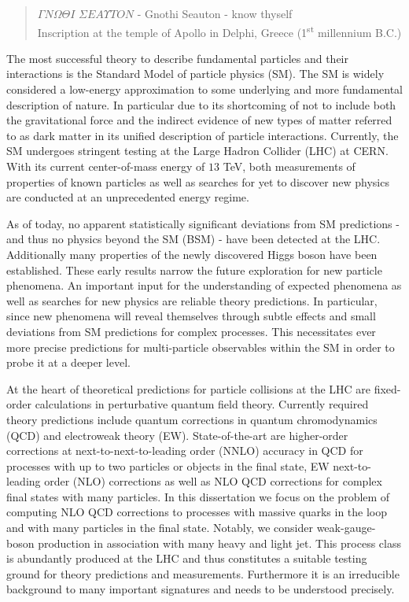 \begin{quote}
$\Gamma N \Omega \Theta I$ $\Sigma E A \Upsilon T
O N$ - Gnothi Seauton - know thyself\\
Inscription at the temple of Apollo in Delphi, Greece
(1\textsuperscript{st} millennium B.C.)
\end{quote}



The most successful theory to describe fundamental particles and their interactions is the
Standard Model of particle physics (SM). The SM is widely considered a low-energy approximation to some underlying and
more fundamental description of nature. In particular due to its shortcoming
of not to include both the gravitational force and the indirect evidence of new types of matter referred to as dark matter in its unified description
of particle interactions. Currently, the SM undergoes stringent testing at the Large Hadron Collider (LHC) at CERN. With its current center-of-mass energy of $13$ TeV, both measurements
of properties of known particles as well as searches for yet to
discover new physics are conducted at an unprecedented
energy regime. 

As of today, no apparent statistically significant deviations from SM predictions - and thus no physics beyond the SM (BSM) - have been detected at the LHC. Additionally many
properties of the newly discovered Higgs boson have been established. These early results narrow
the future exploration
for new particle phenomena. An
important input for the
understanding of
expected phenomena as well as searches for new physics are
reliable theory predictions. In particular, since new
phenomena will reveal themselves through subtle effects and small
deviations from SM predictions for complex processes. This necessitates ever more precise
predictions for multi-particle observables within the SM in order to probe it at a
deeper level.



At the heart of theoretical predictions for particle collisions at
the LHC are fixed-order calculations in perturbative quantum field theory. Currently required theory predictions include quantum corrections in quantum chromodynamics (QCD) and electroweak theory (EW). State-of-the-art are higher-order
corrections at next-to-next-to-leading order (NNLO)
accuracy in QCD for processes with up to two
particles or objects in the final state, EW next-to-leading order
(NLO) corrections as well as
NLO QCD corrections for complex final states with many particles. In
this dissertation we focus on the problem of
computing NLO QCD corrections to processes with massive quarks in the
loop and with many particles in the final state. Notably,
we consider weak-gauge-boson production in association with
many heavy and light jet. This process class is abundantly produced at the LHC and thus constitutes a suitable testing ground for theory predictions and measurements. Furthermore it is an irreducible background to many important signatures and needs to be understood precisely.



